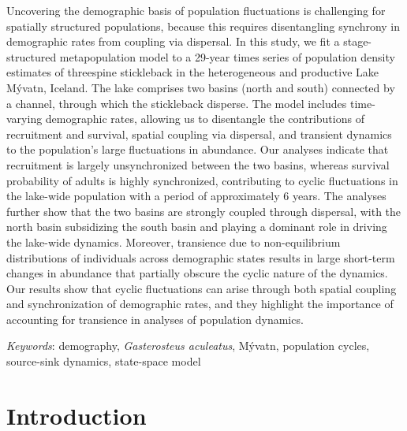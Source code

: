 \documentclass[11pt]{article}
\begin{document}
Uncovering the demographic basis of population fluctuations is challenging 
for spatially structured populations, 
because this requires disentangling synchrony in demographic rates 
from coupling via dispersal. 
In this study, we fit a stage-structured metapopulation model to a 29-year times series 
of population density estimates of threespine stickleback in the heterogeneous 
and productive Lake M\'{y}vatn, Iceland. 
The lake comprises two basins (north and south) connected by a channel, 
through which the stickleback disperse. The model includes time-varying demographic rates, 
allowing us to disentangle the contributions of recruitment and survival, 
spatial coupling via dispersal, and transient dynamics 
to the population’s large fluctuations in abundance. 
Our analyses indicate that recruitment is largely unsynchronized between the two basins, 
whereas survival probability of adults is highly synchronized, 
contributing to cyclic fluctuations in the lake-wide population 
with a period of approximately 6 years. 
The analyses further show that the two basins are strongly coupled through dispersal, 
with the north basin subsidizing the south basin and playing a dominant role 
in driving the lake-wide dynamics. 
Moreover, transience due to non-equilibrium distributions of individuals 
across demographic states results in large short-term changes in abundance 
that partially obscure the cyclic nature of the dynamics. 
Our results show that cyclic fluctuations can arise through both spatial coupling 
and synchronization of demographic rates, and they highlight the importance 
of accounting for transience in analyses of population dynamics.


\bigskip

\textit{Keywords}: {demography, \emph{Gasterosteus aculeatus}, M\'{y}vatn, 
                    population cycles, source-sink dynamics, state-space model}

\clearpage




\section*{Introduction} \label{introduction}
\end{document}
